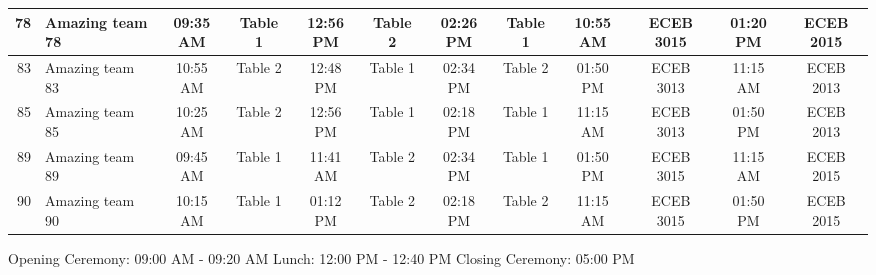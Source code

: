 \documentclass{article}%
\begin{document}
\begin{tabular}{|rl|cc|cc|cc|cc|cc|}
\hline%
78&Amazing team 78&09:35 AM&Table 1&12:56 PM&Table 2&02:26 PM&Table 1&10:55 AM&ECEB 3015&01:20 PM&ECEB 2015\\%
\hline%
83&Amazing team 83&10:55 AM&Table 2&12:48 PM&Table 1&02:34 PM&Table 2&01:50 PM&ECEB 3013&11:15 AM&ECEB 2013\\%
\hline%
85&Amazing team 85&10:25 AM&Table 2&12:56 PM&Table 1&02:18 PM&Table 1&11:15 AM&ECEB 3013&01:50 PM&ECEB 2013\\%
\hline%
89&Amazing team 89&09:45 AM&Table 1&11:41 AM&Table 2&02:34 PM&Table 1&01:50 PM&ECEB 3015&11:15 AM&ECEB 2015\\%
\hline%
90&Amazing team 90&10:15 AM&Table 1&01:12 PM&Table 2&02:18 PM&Table 2&11:15 AM&ECEB 3015&01:50 PM&ECEB 2015\\%
\hline%
\end{tabular}%
\newline%
\newline%
Opening Ceremony: 09:00 AM {-} 09:20 AM%
\newline%
Lunch: 12:00 PM {-} 12:40 PM%
\newline%
Closing Ceremony: 05:00 PM\newline%
\newline%
%
\vspace{0.2in}%
\end{document}
